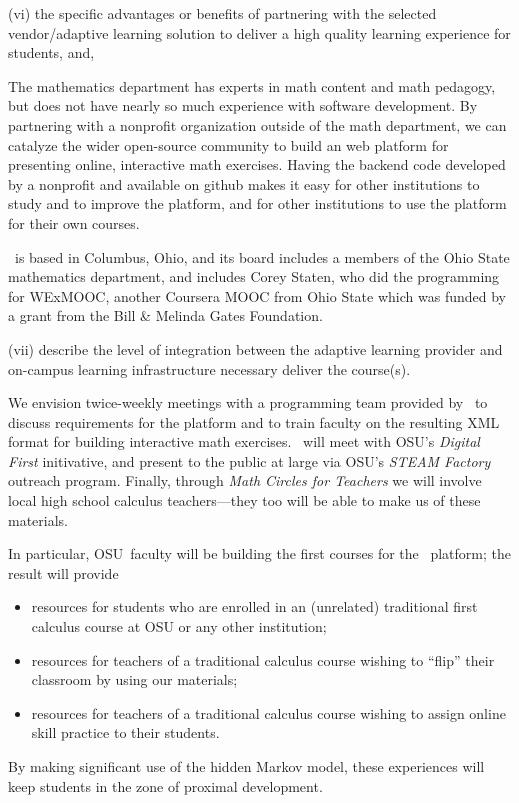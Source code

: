 \begin{question}
 (vi) the specific advantages or benefits of partnering with the
 selected vendor/adaptive learning solution to deliver a high quality
 learning experience for students, and,
\end{question}

The mathematics department has experts in math content and math
pedagogy, but does not have nearly so much experience with software
development.  By partnering with a nonprofit organization outside of
the math department, we can catalyze the wider open-source community
to build an web platform for presenting online, interactive math
exercises.  Having the backend code developed by a nonprofit and
available on github makes it easy for other institutions to study and
to improve the platform, and for other institutions to use the
platform for their own courses.

\gratisu\ is based in Columbus, Ohio, and its board includes a members
of the Ohio State mathematics department, and includes Corey Staten,
who did the programming for WExMOOC, another Coursera MOOC from Ohio
State which was funded by a grant from the Bill \& Melinda Gates
Foundation.

\begin{question}
 (vii) describe the level of integration between the adaptive
 learning provider and on-campus learning infrastructure necessary
 deliver the course(s).
\end{question}

We envision twice-weekly meetings with a programming team provided by
\gratisu\ to discuss requirements for the platform and to train
faculty on the resulting XML format for building interactive math
exercises.  \gratisu\ will meet with OSU's \textsl{Digital First}
initivative, and present to the public at large via OSU's
\textsl{STEAM Factory} outreach program.  Finally, through
\textsl{Math Circles for Teachers} we will involve local high school
calculus teachers---they too will be able to make us of these
materials.

In particular, OSU~faculty will be building the first courses for the \gratisu\ platform; the result will provide
\begin{itemize}
\item resources for students who are enrolled in an (unrelated) traditional first calculus course at OSU or any other institution;
\item resources for teachers of a traditional calculus course wishing to ``flip'' their classroom by using our materials;
\item resources for teachers of a traditional calculus course wishing to assign online skill practice to their students.
\end{itemize}
By making significant use of the hidden Markov model, these
experiences will keep students in the zone of proximal development.

